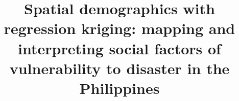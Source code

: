 \documentclass[]{interact}
\theoremstyle{plain}%
\theoremstyle{definition}
\theoremstyle{remark}
\begin{document}

\title{Spatial demographics with regression kriging: mapping and interpreting social factors of vulnerability to disaster in the Philippines}


\maketitle




\end{document}
